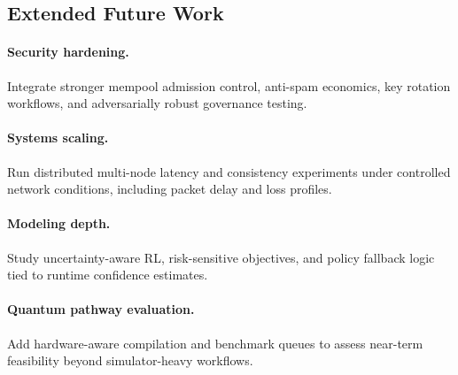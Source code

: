 \subsection{Extended Future Work}

\paragraph{Security hardening.}
Integrate stronger mempool admission control, anti-spam economics, key rotation workflows, and adversarially robust governance testing.

\paragraph{Systems scaling.}
Run distributed multi-node latency and consistency experiments under controlled network conditions, including packet delay and loss profiles.

\paragraph{Modeling depth.}
Study uncertainty-aware RL, risk-sensitive objectives, and policy fallback logic tied to runtime confidence estimates.

\paragraph{Quantum pathway evaluation.}
Add hardware-aware compilation and benchmark queues to assess near-term feasibility beyond simulator-heavy workflows.
